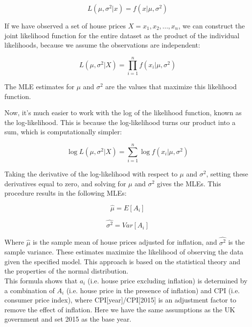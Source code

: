 \documentclass[12pt]{article}  %
\begin{document}
\begin{equation}
L(\mu, \sigma^2|x)=f(x|\mu, \sigma^2)
\end{equation}

If we have observed a set of house prices $X={x_1, x_2, ..., x_n}$, we can construct the joint likelihood function for the entire dataset as the product of the individual likelihoods, because we assume the observations are independent:

\begin{equation}
L(\mu, \sigma^2|X)=\prod_{i=1}^{n} f(x_i|\mu, \sigma^2)
\end{equation}

The MLE estimates for $\mu$ and $\sigma^2$ are the values that maximize this likelihood function.

Now, it's much easier to work with the log of the likelihood function, known as the log-likelihood. This is because the log-likelihood turns our product into a sum, which is computationally simpler:

\begin{equation}
\log L(\mu, \sigma^2|X)=\sum_{i=1}^{n} \log f(x_i|\mu, \sigma^2)
\end{equation}

Taking the derivative of the log-likelihood with respect to $\mu$ and $\sigma^2$, setting these derivatives equal to zero, and solving for $\mu$ and $\sigma^2$ gives the MLEs. This procedure results in the following MLEs:

\begin{equation}
\hat{\mu}=E[A_i]
\end{equation}

\begin{equation}
\hat{\sigma^2}=Var[A_i]
\end{equation}

Where $\hat{\mu}$ is the sample mean of house prices adjusted for inflation, and $\hat{\sigma^2}$ is the sample variance. These estimates maximize the likelihood of observing the data given the specified model. This approach is based on the statistical theory and the properties of the normal distribution.\\
This formula shows that $a_i$ (i.e. house price excluding inflation) is determined by a combination of $A_i$ (i.e. house price in the presence of inflation) and CPI (i.e. consumer price index), where CPI[year]/CPI[2015] is an adjustment factor to remove the effect of inflation. Here we have the same assumptions as the UK government and set 2015 as the base year.
\textsuperscript{\cite{guide}} \
\end{document}
